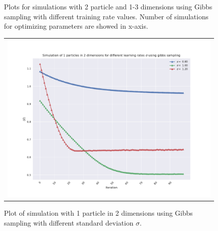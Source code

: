 \begin{figure}
\begin{tabular}{cc}
\end{tabular}
\caption{Plots for simulations with 2 particle and 1-3 dimensions using Gibbs sampling with different training rate values. Number of simulations for optimizing parameters are showed in x-axis.}
\label{fig:1f_2}
\end{figure}

\begin{figure}
\hspace{-2.8cm}
\begin{tabular}{c}
\includegraphics[width = 1.0\paperwidth]{figures/gibbs_08_1_12_gamma04.pdf}\\
\end{tabular}
\caption{Plot of simulation with 1 particle in 2 dimensions using Gibbs sampling with different standard deviation $\sigma$.}
\label{fig:1f_3}
\end{figure}
